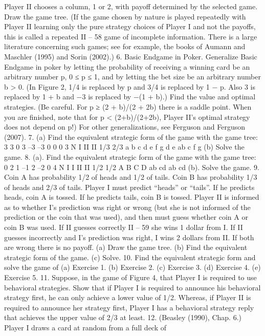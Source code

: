 Player II chooses a column, 1 or 2, with payoff determined by the selected game. Draw
the game tree. (If the game chosen by nature is played repeatedly with Player II learning
only the pure strategy choices of Player I and not the payoffs, this is called a repeated
II – 58
game of incomplete information. There is a large literature concerning such games; see for
example, the books of Aumann and Maschler (1995) and Sorin (2002).)
6. Basic Endgame in Poker. Generalize Basic Endgame in poker by letting the
probability of receiving a winning card be an arbitrary number p, 0 ≤ p ≤ 1, and by letting
the bet size be an arbitrary number b > 0. (In Figure 2, 1/4 is replaced by p and 3/4 is
replaced by 1 − p. Also 3 is replaced by 1 + b and −3 is replaced by −(1 + b).) Find the
value and optimal strategies. (Be careful. For p ≥ (2 + b)/(2 + 2b) there is a saddle point.
When you are finished, note that for p < (2+b)/(2+2b), Player II’s optimal strategy does
not depend on p!) For other generalizations, see Ferguson and Ferguson (2007).
7. (a) Find the equivalent strategic form of the game with the game tree:
3
3 0 3 –3 –3 0 0 0 3
N
I II
II
1/3 2/3
a b c d e
f g d e ab c f g
(b) Solve the game.
8. (a). Find the equivalent strategic form of the game with the game tree:
0 2 1 –1 2 –2 0 4
N
I I
II II
1/2 1/2
A B C D
ab cd ab cd
(b). Solve the game.
9. Coin A has probability 1/2 of heads and 1/2 of tails. Coin B has probability 1/3 of
heads and 2/3 of tails. Player I must predict “heads” or “tails”. If he predicts heads, coin
A is tossed. If he predicts tails, coin B is tossed. Player II is informed as to whether I’s
prediction was right or wrong (but she is not informed of the prediction or the coin that
was used), and then must guess whether coin A or coin B was used. If II guesses correctly
II – 59
she wins 1 dollar from I. If II guesses incorrectly and I’s prediction was right, I wins 2
dollars from II. If both are wrong there is no payoff.
(a) Draw the game tree.
(b) Find the equivalent strategic form of the game.
(c) Solve.
10. Find the equivalent strategic form and solve the game of
(a) Exercise 1.
(b) Exercise 2.
(c) Exercise 3.
(d) Exercise 4.
(e) Exercise 5.
11. Suppose, in the game of Figure 4, that Player I is required to use behavioral
strategies. Show that if Player I is required to announce his behavioral strategy first, he
can only achieve a lower value of 1/2. Whereas, if Player II is required to announce her
strategy first, Player I has a behavioral strategy reply that achieves the upper value of 2/3
at least.
12. (Beasley (1990), Chap. 6.) Player I draws a card at random from a full deck of
